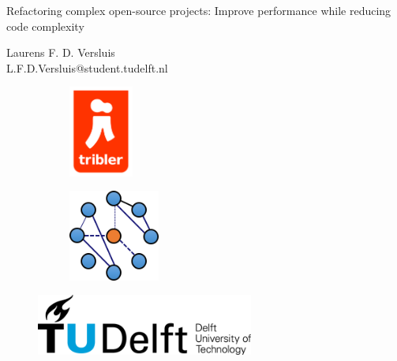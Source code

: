 \begin{titlepage}

\null\vfill

\begin{center}
\LARGE{Refactoring complex open-source projects: Improve performance while reducing code complexity}
\end{center}

\vspace{1.5cm}

\begin{center}
Laurens F. D. Versluis\\
L.F.D.Versluis@student.tudelft.nl
\end{center}

\vfill

\centering
\begin{figure}[!b]
\captionsetup[subfigure]{labelformat=empty}
\begin{subfigure}{0.4\textwidth}
\centering
\includegraphics[height=3cm]{pics/triblerlogo}
\caption{}
\end{subfigure}%
\begin{subfigure}{0.6\textwidth}
\centering
\includegraphics[height=3cm]{pics/dslogo}
\caption{}
\end{subfigure}%
\end{figure}

\begin{figure}[!b]
\centering
\includegraphics[height=2cm]{pics/TUDLogo}
\end{figure}


\vspace{2.0cm}

\end{titlepage}
